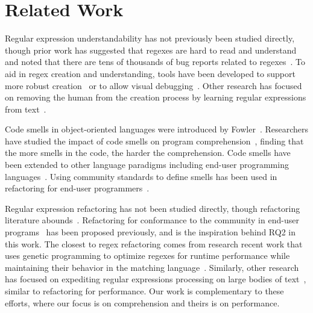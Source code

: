 \section{Related Work}
\label{sec:related}
Regular expression understandability has not previously been studied directly, though prior work has suggested that regexes are hard to read and understand~\cite{chapman2016} and noted that there are tens of thousands of bug reports related to regexes~\cite{Spishak:2012:TSR:2318202.2318207}. 
To aid in regex creation and understanding,  tools have been developed to support more robust creation~\cite{Spishak:2012:TSR:2318202.2318207} or to allow visual debugging~\cite{Beck:2014:RVD:2591062.2591111}. Other research has focused on removing the human from the creation process by learning regular expressions from  text~\cite{Babbar:2010:CBA:1871840.1871848, Li:2008:REL:1613715.1613719}.

Code smells in object-oriented languages were introduced by Fowler~\cite{Fowl1999}. Researchers have studied the impact of code smells on program comprehension~\cite{abbes2011empirical, du2006does}, finding that the more smells in the code, the harder the comprehension. 
Code smells have been extended to other language paradigms including end-user programming languages~\cite{Hermans2012intra, Hermans2012intraExt, stoleeicse, stoleeTSE}. 
Using community standards to define smells has been used in refactoring   for end-user programmers~\cite{stoleeicse, stoleeTSE}. 

Regular expression refactoring has not been studied directly, though refactoring literature abounds~\cite{Mens:2004:SSR:972215.972286, opdyke1992refactoring, Griswold:1993:AAP:152388.152389}. 
Refactoring for conformance to the community in end-user programs~\cite{stoleeicse, stoleeTSE} has been proposed previously, and is the inspiration behind RQ2 in this work.
The closest to regex refactoring comes from research recent work that uses genetic programming to optimize regexes for runtime performance while maintaining their behavior in the matching language~\cite{cody2017search}. 
Similarly, other research has focused on expediting  regular expressions processing on large bodies of text~\cite{Baeza-Yates:1996:FTS:235809.235810},  similar to refactoring for performance. 
Our work is complementary to these efforts, where our focus is on comprehension and theirs is on performance. 

